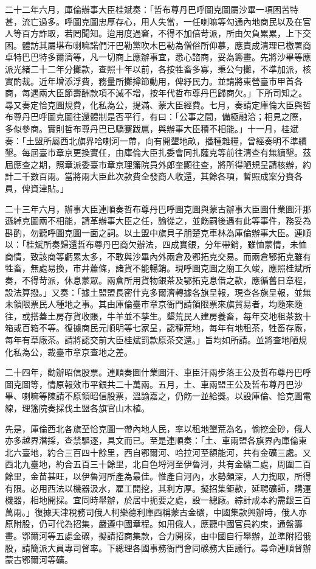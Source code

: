 \begin{pinyinscope}
二十二年六月，庫倫辦事大臣桂斌奏：「哲布尊丹巴呼圖克圖屬沙畢一項困苦特甚，流亡過多。呼圖克圖忠厚存心，用人失當，一任喇嘛等勾通內地商民以及在官人等百方詐取，若罔聞知。迨用度過窘，不得不加倍苛派，所由欠負累累，上下交困。體訪其屬堪布喇嘛諾們汗巴勒黨吹木巴勒為僧俗所仰慕，應責成清理已檄署商卓特巴巴特多爾濟等，凡一切商上應辦事宜，悉心諮商，妥為籌畫。先將沙畢等應派光緒二十二年分攤款，查照十年以前，各按牲畜多寡，秉公勻攤，不準加派，核實酌裁。近年增添浮費，務量所攤撙節動用，俾紓民力。並請將東營臺市甲首各商，每遇兩大臣節壽酬款項不減不增，按年代哲布尊丹巴歸商欠。」下所司知之。尋又奏定恰克圖規費，化私為公，提滿、蒙大臣經費。七月，奏請定庫倫大臣與哲布尊丹巴呼圖克圖往還體制是否平行，有曰：「公事之間，備極融洽；相見之際，多似參商。實則哲布尊丹巴已驕蹇跋扈，與辦事大臣積不相能。」十一月，桂斌奏：「土盟所屬西北旗界哈喇河一帶，向有開墾地畝，播種雜糧，曾經奏明不準續墾。每屆臺市章京更換實任，由庫倫大臣扎委會同扎薩克等前往清查有無續墾。茲屆應查之期，照章派委臺市章京理籓院員外郎奎顯往查，將所得陋規呈請核辦，約計二千數百兩。當將兩大臣此次款費全發商人收還，其餘各項，暫照成案分賚各員，俾資津貼。」

二十三年六月，辦事大臣連順奏哲布尊丹巴呼圖克圖與蒙古辦事大臣圖什業圖汗那遜綽克圖兩不相能，請革辦事大臣之任，諭從之，並飭嗣後遇有此等事件，務妥為斟酌，勿聽呼圖克圖一面之詞。以土盟中旗貝子朋楚克車林為庫倫辦事大臣。連順以：「桂斌所奏歸還哲布尊丹巴商欠辦法，四成實銀，分年帶銷，雖恤蒙情，未恤商情，致該商等虧累太多，不敢與沙畢內外兩倉及鄂拓克交易。而兩倉鄂拓克雖有牲畜，無處易換，市井蕭條，諸貨不能暢銷。現呼圖克圖之廟工久竣，應照桂斌所奏，不得苛派，休息蒙眾。兩倉所用貨物銀茶及鄂拓克息借之款，應循舊日章程，設法算撥。」又奏：「據土盟盟長密什克多爾濟轉據各旗呈報，現查各旗呈報，並無未領限票民人種地之事。其由庫倫臺市章京衙門請領限票來旗貿易者，均隨來隨往，或搭蓋土房存貨收賬，牛羊並不孳生。墾荒民人建房養畜，每年交地租茶數十箱或百箱不等。復據商民元順明等七家呈，認種荒地，每年有地租茶，牲畜存廠，每年有草廠茶。請將認交前大臣桂斌罰款原茶交還。」旨均如所請。並將查地陋規化私為公，裁臺市章京查地之差。

二十四年，勸辦昭信股票。連順奏圖什業圖汗、車臣汗兩步落王公及哲布尊丹巴呼圖克圖等，情原報效市平銀共二十萬兩。五月，土、車兩盟王公及哲布尊丹巴沙畢、喇嘛等陳請不原領昭信股票，溫諭嘉之，仍飭一並給獎。以設庫倫、恰克圖電線，理籓院奏採伐土盟各旗官山木植。

先是，庫倫西北各旗至恰克圖一帶內地人民，率以租地墾荒為名，偷挖金砂，俄人亦多越界潛採，查禁驅逐，具文而已。至是連順奏：「土、車兩盟各旗界內庫倫東北六臺地，約合三百四十餘里，西自鄂爾河、哈拉河至額能河，共有金礦三處。又西北九臺地，約合五百三十餘里，北自色埒河至伊魯河，共有金礦二處，周圍二百餘里，金苗甚旺，以伊魯河所產為最佳。惟產自河內，水勢頗深，人力掏取，所得有限。必用西法以機器汲水，雇工開挖，其利方厚。擬招集鉅款，延聘礦師，購運機器，相地開採。宜同時舉辦，於居中扼要之處，設一總廠。綜計成本約需銀三百萬兩。」復據天津稅務司俄人柯樂德利庫西稱蒙古金礦，中國集款興辦時，俄人亦原附股，仍可代為招集，嚴遵中國章程。如用俄人，應聽中國官員約束，通盤籌畫。鄂爾河等五處金礦，擬請招商集款，合力開採，由中國自行舉辦，並準附招俄股，請簡派大員專司督率。下總理各國事務衙門會同礦務大臣議行。尋命連順督辦蒙古鄂爾河等礦。


\end{pinyinscope}
